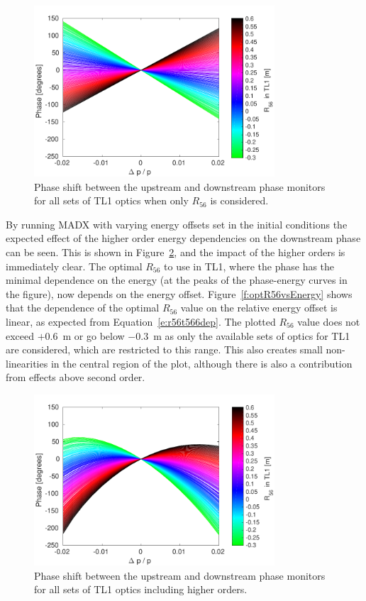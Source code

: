 \begin{figure}
  \centering
  \includegraphics[width=0.8\textwidth]{Figures/propagation/phaseVsEn_r56Only}
  \caption{Phase shift between the upstream and downstream phase monitors for all sets of TL1 optics when only \(R_{56}\) is considered.}
  \label{f:phaseVsEn_r56Only}
\end{figure}

By running MADX with varying energy offsets set in the initial conditions the expected effect of the higher order energy dependencies on the downstream phase can be seen. This is shown in Figure~\ref{f:phaseVsEn_t566}, and the impact of the higher orders is immediately clear. The optimal \(R_{56}\) to use in TL1, where the phase has the minimal dependence on the energy (at the peaks of the phase-energy curves in the figure), now depends on the energy offset. Figure~\ref{f:optR56vsEnergy} shows that the dependence of the optimal \(R_{56}\) value on the relative energy offset is linear, as expected from Equation~\ref{e:r56t566dep}. The plotted \(R_{56}\) value does not exceed \(+0.6\)~m or go below \(-0.3\)~m as only the available sets of optics for TL1 are considered, which are restricted to this range. This also creates small non-linearities in the central region of the plot, although there is also a contribution from effects above second order. 

\begin{figure}
  \centering
  \includegraphics[width=0.8\textwidth]{Figures/propagation/phaseVsEn_t566}
  \caption{Phase shift between the upstream and downstream phase monitors for all sets of TL1 optics including higher orders.}
  \label{f:phaseVsEn_t566}
\end{figure}

